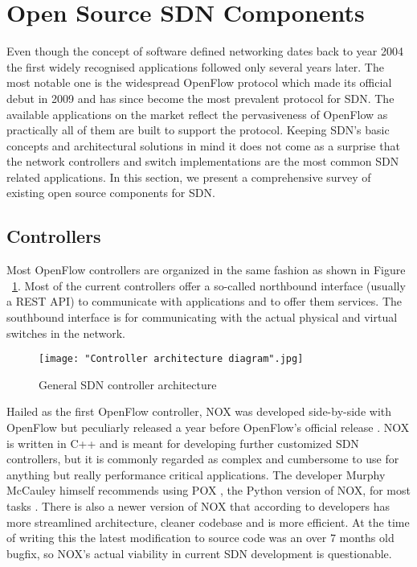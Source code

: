 \section{Open Source SDN Components}

Even though the concept of software defined networking dates back to year 2004 \cite{robert2012system} the first widely recognised applications followed only several years later. The most notable one is the widespread OpenFlow protocol \cite{OpenFlow1.0.0} which made its official debut in 2009 and has since become the most prevalent protocol for SDN. The available applications on the market reflect the pervasiveness of OpenFlow as practically all of them are built to support the protocol. Keeping SDN’s basic concepts and architectural solutions in mind it does not come as a surprise that the network controllers and switch implementations are the most common SDN related applications. In this section, we present a comprehensive survey of existing open source components for SDN.

\subsection{Controllers}

Most OpenFlow controllers are organized in the same fashion as shown in Figure ~\ref{fig:architecture}. Most of the current controllers offer a so-called northbound interface (usually a REST API) to communicate with applications and to offer them services. The southbound interface is for communicating with the actual physical and virtual switches in the network.

\begin{figure}[ht!]
\centering
{}
\texttt{[image: "Controller architecture diagram".jpg]}
\caption{General SDN controller architecture}
\label{fig:architecture}
\end{figure}

	Hailed as the first OpenFlow controller, NOX was developed side-by-side with OpenFlow but peculiarly released a year before OpenFlow’s official release \cite{NOX}. NOX is written in C++ and is meant for developing further customized SDN controllers, but it is commonly regarded as complex and cumbersome to use for anything but really performance critical applications. The developer Murphy McCauley himself recommends using POX \cite{POX}, the Python version of NOX, for most tasks \cite{CHU12}. There is also a newer version of NOX that according to developers has more streamlined architecture, cleaner codebase and is more efficient. At the time of writing this the latest modification to source code was an over 7 months old bugfix, so NOX’s actual viability in current SDN development is questionable.

